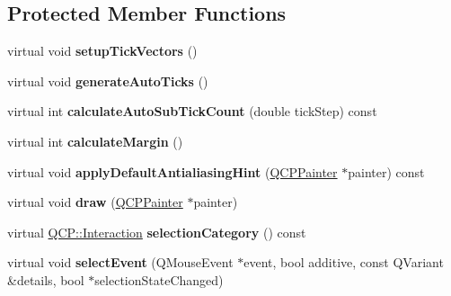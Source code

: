 \subsection*{\-Protected \-Member \-Functions}
\begin{DoxyCompactItemize}
\item 
\hypertarget{classQCPAxis_a57d9e961bae7d62f5b4e1f143e660c78}{virtual void {\bfseries setup\-Tick\-Vectors} ()}\label{classQCPAxis_a57d9e961bae7d62f5b4e1f143e660c78}

\item 
\hypertarget{classQCPAxis_a626eef437c874148df1a5ac78506d463}{virtual void {\bfseries generate\-Auto\-Ticks} ()}\label{classQCPAxis_a626eef437c874148df1a5ac78506d463}

\item 
\hypertarget{classQCPAxis_a3c5c045019fcdc0843a3e064eda7478a}{virtual int {\bfseries calculate\-Auto\-Sub\-Tick\-Count} (double tick\-Step) const }\label{classQCPAxis_a3c5c045019fcdc0843a3e064eda7478a}

\item 
\hypertarget{classQCPAxis_a47bdb0a55de6759489ee47665199aebb}{virtual int {\bfseries calculate\-Margin} ()}\label{classQCPAxis_a47bdb0a55de6759489ee47665199aebb}

\item 
\hypertarget{classQCPAxis_a13bde39eb1e0b7c14a02935689be8aba}{virtual void {\bfseries apply\-Default\-Antialiasing\-Hint} (\hyperlink{classQCPPainter}{\-Q\-C\-P\-Painter} $\ast$painter) const }\label{classQCPAxis_a13bde39eb1e0b7c14a02935689be8aba}

\item 
\hypertarget{classQCPAxis_a258b1e783eda5cd14ec5552c696a424e}{virtual void {\bfseries draw} (\hyperlink{classQCPPainter}{\-Q\-C\-P\-Painter} $\ast$painter)}\label{classQCPAxis_a258b1e783eda5cd14ec5552c696a424e}

\item 
\hypertarget{classQCPAxis_aca53b2f365dfc1257cba9e62395aa68f}{virtual \hyperlink{namespaceQCP_a2ad6bb6281c7c2d593d4277b44c2b037}{\-Q\-C\-P\-::\-Interaction} {\bfseries selection\-Category} () const }\label{classQCPAxis_aca53b2f365dfc1257cba9e62395aa68f}

\item 
\hypertarget{classQCPAxis_aa8a5fe80e2898ec08ada26b5fbee9eca}{virtual void {\bfseries select\-Event} (\-Q\-Mouse\-Event $\ast$event, bool additive, const \-Q\-Variant \&details, bool $\ast$selection\-State\-Changed)}\label{classQCPAxis_aa8a5fe80e2898ec08ada26b5fbee9eca}


\end{DoxyCompactItemize}
